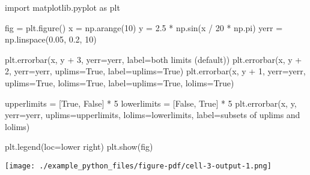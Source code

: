 \documentclass[
  letterpaper,
  DIV=11,
  numbers=noendperiod]{scrreprt}
\newenvironment{Shaded}{\begin{snugshade}}{\end{snugshade}}
\newcommand{\DecValTok}[1]{\textcolor[rgb]{0.68,0.00,0.00}{#1}}
\newcommand{\FloatTok}[1]{\textcolor[rgb]{0.68,0.00,0.00}{#1}}
\newcommand{\ImportTok}[1]{\textcolor[rgb]{0.00,0.46,0.62}{#1}}
\newcommand{\NormalTok}[1]{\textcolor[rgb]{0.00,0.46,0.62}{#1}}
\newcommand{\OperatorTok}[1]{\textcolor[rgb]{0.37,0.37,0.37}{#1}}
\newcommand{\StringTok}[1]{\textcolor[rgb]{0.13,0.47,0.30}{#1}}
\newcommand{\VariableTok}[1]{\textcolor[rgb]{0.07,0.07,0.07}{#1}}
\begin{document}
\begin{Shaded}
\begin{Highlighting}[]
\ImportTok{import}\NormalTok{ matplotlib.pyplot }\ImportTok{as}\NormalTok{ plt}

\NormalTok{fig }\OperatorTok{=}\NormalTok{ plt.figure()}
\NormalTok{x }\OperatorTok{=}\NormalTok{ np.arange(}\DecValTok{10}\NormalTok{)}
\NormalTok{y }\OperatorTok{=} \FloatTok{2.5} \OperatorTok{*}\NormalTok{ np.sin(x }\OperatorTok{/} \DecValTok{20} \OperatorTok{*}\NormalTok{ np.pi)}
\NormalTok{yerr }\OperatorTok{=}\NormalTok{ np.linspace(}\FloatTok{0.05}\NormalTok{, }\FloatTok{0.2}\NormalTok{, }\DecValTok{10}\NormalTok{)}

\NormalTok{plt.errorbar(x, y }\OperatorTok{+} \DecValTok{3}\NormalTok{, yerr}\OperatorTok{=}\NormalTok{yerr, label}\OperatorTok{=}\StringTok{\textquotesingle{}both limits (default)\textquotesingle{}}\NormalTok{)}
\NormalTok{plt.errorbar(x, y }\OperatorTok{+} \DecValTok{2}\NormalTok{, yerr}\OperatorTok{=}\NormalTok{yerr, uplims}\OperatorTok{=}\VariableTok{True}\NormalTok{, label}\OperatorTok{=}\StringTok{\textquotesingle{}uplims=True\textquotesingle{}}\NormalTok{)}
\NormalTok{plt.errorbar(x, y }\OperatorTok{+} \DecValTok{1}\NormalTok{, yerr}\OperatorTok{=}\NormalTok{yerr, uplims}\OperatorTok{=}\VariableTok{True}\NormalTok{, lolims}\OperatorTok{=}\VariableTok{True}\NormalTok{,}
\NormalTok{             label}\OperatorTok{=}\StringTok{\textquotesingle{}uplims=True, lolims=True\textquotesingle{}}\NormalTok{)}

\NormalTok{upperlimits }\OperatorTok{=}\NormalTok{ [}\VariableTok{True}\NormalTok{, }\VariableTok{False}\NormalTok{] }\OperatorTok{*} \DecValTok{5}
\NormalTok{lowerlimits }\OperatorTok{=}\NormalTok{ [}\VariableTok{False}\NormalTok{, }\VariableTok{True}\NormalTok{] }\OperatorTok{*} \DecValTok{5}
\NormalTok{plt.errorbar(x, y, yerr}\OperatorTok{=}\NormalTok{yerr, uplims}\OperatorTok{=}\NormalTok{upperlimits, lolims}\OperatorTok{=}\NormalTok{lowerlimits,}
\NormalTok{             label}\OperatorTok{=}\StringTok{\textquotesingle{}subsets of uplims and lolims\textquotesingle{}}\NormalTok{)}

\NormalTok{plt.legend(loc}\OperatorTok{=}\StringTok{\textquotesingle{}lower right\textquotesingle{}}\NormalTok{)}
\NormalTok{plt.show(fig)}
\end{Highlighting}
\end{Shaded}

\texttt{[image: ./example\_python\_files/figure-pdf/cell-3-output-1.png]}
\end{document}
